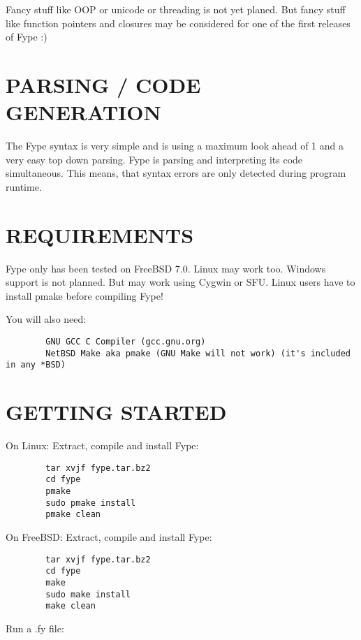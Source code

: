 Fancy stuff like OOP or unicode or threading is not yet planed. But fancy stuff like function pointers and closures may be considered for one of the first releases of Fype :)

\section{PARSING / CODE GENERATION\label{PARSING_CODE_GENERATION}}


The Fype syntax is very simple and is using a maximum look ahead of 1 and a very easy top down parsing. Fype is parsing and interpreting its code simultaneous. This means, that syntax errors are only detected during program runtime.

\section{REQUIREMENTS\label{REQUIREMENTS}}


Fype only has been tested on FreeBSD 7.0. Linux may work too. Windows support is not planned. But may work using Cygwin or SFU. Linux users have to install pmake before compiling Fype!



You will also need:

\begin{verbatim}
        GNU GCC C Compiler (gcc.gnu.org)
        NetBSD Make aka pmake (GNU Make will not work) (it's included in any *BSD)
\end{verbatim}
\section{GETTING STARTED\label{GETTING_STARTED}}


On Linux: Extract, compile and install Fype:

\begin{verbatim}
        tar xvjf fype.tar.bz2
        cd fype
        pmake
        sudo pmake install 
        pmake clean
\end{verbatim}


On FreeBSD: Extract, compile and install Fype:

\begin{verbatim}
        tar xvjf fype.tar.bz2
        cd fype
        make
        sudo make install 
        make clean
\end{verbatim}


Run a .fy file:

